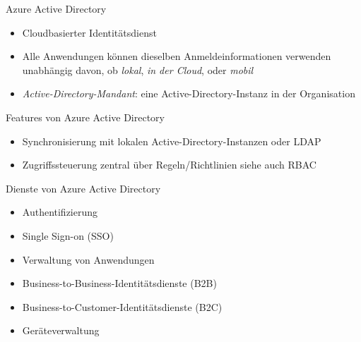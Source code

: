\begin{flashcard}[Definition]{Azure Active Directory}
    \begin{itemize}
        \item Cloudbasierter Identitätsdienst
        \item Alle Anwendungen können dieselben Anmeldeinformationen verwenden\newline
        unabhängig davon, ob \emph{lokal}, \emph{in der Cloud}, oder \emph{mobil}
        \item \emph{Active-Directory-Mandant}: eine Active-Directory-Instanz in der Organisation
    \end{itemize}
\end{flashcard}

\begin{flashcard}[\ ]{Features von Azure Active Directory}
    \begin{itemize}
        \item Synchronisierung mit lokalen Active-Directory-Instanzen oder LDAP
        \item Zugriffssteuerung zentral über Regeln/Richtlinien\newline
        siehe auch RBAC
    \end{itemize}
\end{flashcard}

\begin{flashcard}[\ ]{Dienste von Azure Active Directory}
    \begin{itemize}
        \item Authentifizierung
        \item Single Sign-on (SSO)
        \item Verwaltung von Anwendungen
        \item Business-to-Business-Identitätsdienste (B2B)
        \item Business-to-Customer-Identitätsdienste (B2C)
        \item Geräteverwaltung
    \end{itemize}
\end{flashcard}

